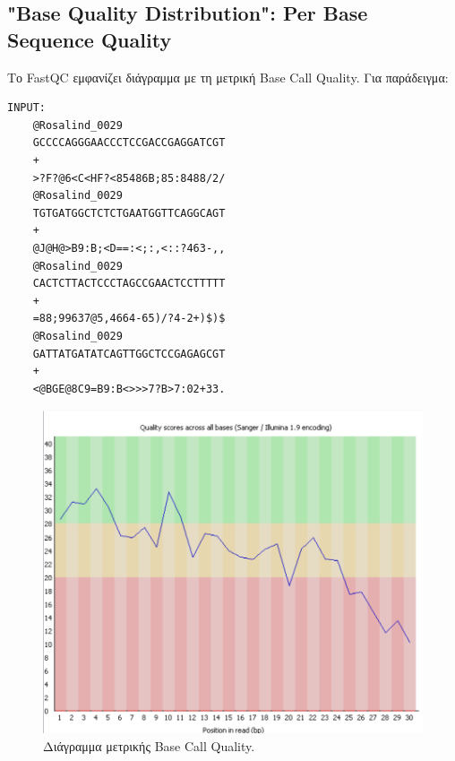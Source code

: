    \subsection{"Base Quality Distribution": Per Base Sequence Quality}
        Το FastQC \cite{FastQC} εμφανίζει διάγραμμα με τη μετρική Base Call Quality. Για παράδειγμα:
    \begin{graycomment} \footnotesize
         \begin{multicols}{2} \centering
             \begin{verbatim}
INPUT:
    @Rosalind_0029
    GCCCCAGGGAACCCTCCGACCGAGGATCGT
    +
    >?F?@6<C<HF?<85486B;85:8488/2/
    @Rosalind_0029
    TGTGATGGCTCTCTGAATGGTTCAGGCAGT
    +
    @J@H@>B9:B;<D==:<;:,<::?463-,,
    @Rosalind_0029
    CACTCTTACTCCCTAGCCGAACTCCTTTTT
    +
    =88;99637@5,4664-65)/?4-2+)$)$
    @Rosalind_0029
    GATTATGATATCAGTTGGCTCCGAGAGCGT
    +
    <@BGE@8C9=B9:B<>>>7?B>7:02+33.
             \end{verbatim}
        \end{multicols}
    \end{graycomment}

    \begin{figure}[H] \noindent \centering
        \includegraphics[scale=0.6]{img/Per Base Sequence Quality}
        \caption{Διάγραμμα μετρικής Base Call Quality.}
    \end{figure}

